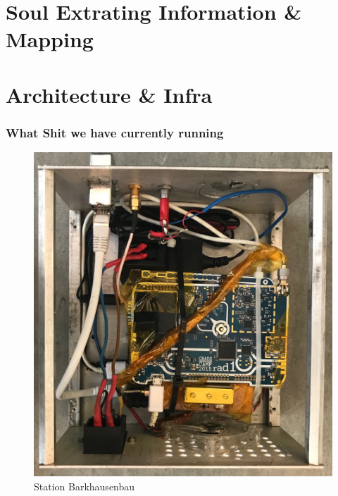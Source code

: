 \documentclass[aspectratio=169]{beamer}
\begin{document}

\section{Soul Extrating Information \& Mapping }




\section{Architecture \& Infra }


\begin{frame}
\frametitle{What Shit we have currently running}

\begin{figure}
\centering
\includegraphics[height=0.9\textheight, angle=90]{figs/station_barkhausen.jpg}
\caption{Station Barkhausenbau}
\end{figure}

\end{frame}
\end{document}
